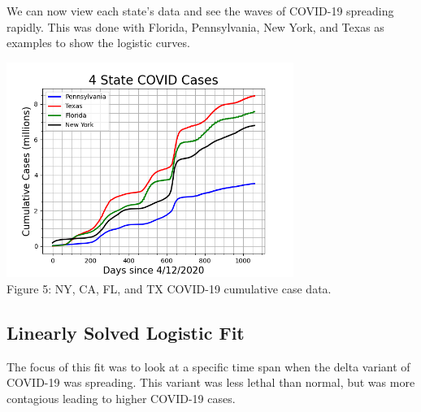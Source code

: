 \documentclass[12pt]{article}
\begin{document}
\noindent We can now view each state's data and see the waves of COVID-19 spreading rapidly. This was done with Florida, Pennsylvania, New York, and Texas as examples to show the logistic curves.

\begin{Figure}
\begin{center}
\includegraphics[width = 0.7\textwidth]{4 state data.png} \\
Figure 5: NY, CA, FL, and TX COVID-19 cumulative case data.
\end{center}
\label{5}
\end{Figure}

\pagebreak

\subsection{Linearly Solved Logistic Fit}
\noindent The focus of this fit was to look at a specific time span when the delta variant of COVID-19 was spreading. This variant was less lethal than normal, but was more contagious leading to higher COVID-19 cases. \\
\end{document}
